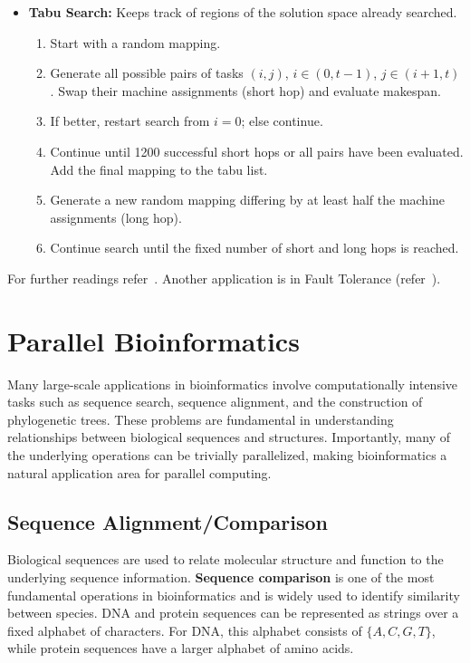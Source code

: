 \documentclass[12pt]{book}
\begin{document}
\begin{itemize}
    \item \textbf{Tabu Search:}  
    Keeps track of regions of the solution space already searched.  
    \begin{enumerate}
        \item Start with a random mapping.  
        \item Generate all possible pairs of tasks $(i,j)$, $i \in (0,t-1)$, $j \in (i+1,t)$. Swap their machine assignments (short hop) and evaluate makespan.  
        \item If better, restart search from $i=0$; else continue.  
        \item Continue until 1200 successful short hops or all pairs have been evaluated. Add the final mapping to the tabu list.  
        \item Generate a new random mapping differing by at least half the machine assignments (long hop).  
        \item Continue search until the fixed number of short and long hops is reached.
    \end{enumerate}
\end{itemize}

For further readings refer~\cite{shmueli2005backfilling,braun1999comparison}.
Another application is in Fault Tolerance (refer~\cite{plank1997overview}).

\section{Parallel Bioinformatics}
Many large-scale applications in bioinformatics involve computationally intensive tasks such as sequence search, sequence alignment, and the construction of phylogenetic trees. These problems are fundamental in understanding relationships between biological sequences and structures. Importantly, many of the underlying operations can be trivially parallelized, making bioinformatics a natural application area for parallel computing.

\subsection{Sequence Alignment/Comparison}
Biological sequences are used to relate molecular structure and function to the underlying sequence information. \textbf{Sequence comparison} is one of the most fundamental operations in bioinformatics and is widely used to identify similarity between species. DNA and protein sequences can be represented as strings over a fixed alphabet of characters. For DNA, this alphabet consists of $\{A, C, G, T\}$, while protein sequences have a larger alphabet of amino acids.
\end{document}
